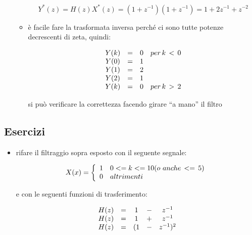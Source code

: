 \begin{itemize}
\begin{itemize}
		 \begin{equation}
						 Y^{*}(z) = H(z)X^{*}(z) = (1+z^{-1})(1+z^{-1}) = 1 + 2 z^{-1} + z^{-2}
		 \end{equation}

 \item \`e facile fare la trasformata inversa perch\'e ci sono tutte potenze decrescenti
       di zeta, quindi:
 
			 	\begin{equation}
								\begin{array}{c c c l}
           Y(k) & = & 0 & per\,k\,<\,0 \\
           Y(0) & = & 1 & \\
           Y(1) & = & 2 & \\
           Y(2) & = & 1 & \\
           Y(k) & = & 0 & per\,k\,>\,2\\
								\end{array}
		 \end{equation}
 
       si pu\`o verificare la correttezza facendo girare ``a mano'' il filtro

			\end{itemize}
%
%

\end{itemize}

\subsection*{Esercizi}

\begin{itemize}
 
 \item rifare il filtraggio sopra esposto con il seguente segnale:

				 \begin{equation}
						X(x) = \left\{
						   \begin{array}{c l}
									1 & 0 <= k <= 10 (o\,\,anche\,<=\,5)\\
									0 & altrimenti\\
							 \end{array} \right.
		     \end{equation}
 
       e con le seguenti funzioni di trasferimento:
 
			 	\begin{equation}
					\begin{array}{c c c c c}
	  				H(z) & = & 1 & - & z^{-1}\\
						 H(z) & = & 1 & + & z^{-1}\\
             H(z) & = & ( 1 & - & z^{-1} )^2\\
	      	 \end{array}
	       \end{equation}

\end{itemize}

